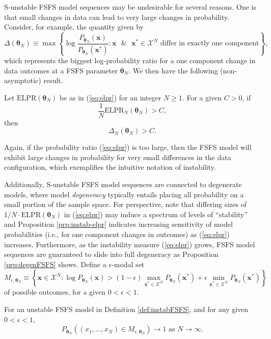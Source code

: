 \documentclass[12pt]{article}
\theoremstyle{definition}
\let\BeginKnitrBlock\begin \let\EndKnitrBlock\end
\begin{document}
S-unstable FSFS model sequences may be undesirable for several reasons.
One is that small changes in data can lead to very large changes in
probability. Consider, for example, the quantity given by \[
\Delta(\boldsymbol \theta_N) \equiv \max \left\{\log \frac{P_{\boldsymbol \theta_N}(\boldsymbol x)}{P_{\boldsymbol \theta_N}(\boldsymbol x^*)} : \boldsymbol x \text{ }\& \text{ } \boldsymbol x^* \in \mathcal{X}^N \text{ differ in exactly one component}\right\},
\] which represents the biggest log-probability ratio for a one
component change in data outcomes at a FSFS parameter
\(\boldsymbol \theta_N\). We then have the following (non-asymptotic)
result.

\BeginKnitrBlock{proposition}
\protect\hypertarget{prp:instab-elpr}{}{\label{prp:instab-elpr}}Let
\(\text{ELPR}(\boldsymbol \theta_N)\) be as in (\eqref{eq:elpr}) for an
integer \(N \ge 1\). For a given \(C>0\), if
\[\frac{1}{N}\text{ELPR}_N(\boldsymbol \theta_N) > C,\] then
\[\Delta_N(\boldsymbol \theta_N) > C.\]
\EndKnitrBlock{proposition}

Again, if the probability ratio (\eqref{eq:elpr}) is too large, then the
FSFS model will exhibit large changes in probability for very small
differences in the data configuration, which exemplifies the intuitive
notation of instability.

Additionally, S-unstable FSFS model sequences are connected to
degenerate models, where model \emph{degeneracy} typically entails
placing all probability on a small portion of the sample space. For
perspective, note that differing sizes of
\(1/N\cdot\text{ELPR}(\boldsymbol \theta_N)\) in (\eqref{eq:elpr}) may
induce a spectrum of levels of ``stability'' and Proposition
\ref{prp:instab-elpr} indicates increasing sensitivity of model
probabilities (i.e., for one component changes in outcomes) as
(\eqref{eq:elpr}) increases. Furthermore, as the instability measure
(\eqref{eq:elpr}) grows, FSFS model sequences are guaranteed to slide into
full degeneracy as Proposition \ref{prp:degenFSFS} shows. Define a
\(\epsilon\)-modal set \[
M_{\epsilon, \boldsymbol \theta_N} \equiv \left\{\boldsymbol x \in \mathcal{X}^N: \log P_{\boldsymbol \theta_N}(\boldsymbol x) > (1-\epsilon)\max\limits_{\boldsymbol x^* \in \mathcal{X}^N}P_{\boldsymbol \theta_N}(\boldsymbol x^*) + \epsilon\min\limits_{\boldsymbol x^* \in \mathcal{X}^N}P_{\boldsymbol \theta_N}(\boldsymbol x^*) \right\}
\] of possible outcomes, for a given \(0 < \epsilon < 1\).

\BeginKnitrBlock{proposition}
\protect\hypertarget{prp:degenFSFS}{}{\label{prp:degenFSFS}}For an unstable
FSFS model in Definition \ref{def:instabFSFS}, and for any given
\(0 < \epsilon < 1\), \[
P_{\boldsymbol \theta_N}\left((x_1, \dots, x_N) \in M_{\epsilon, \boldsymbol \theta_N}\right) \rightarrow 1 \text{ as } N \rightarrow \infty.
\]
\EndKnitrBlock{proposition}
\end{document}
